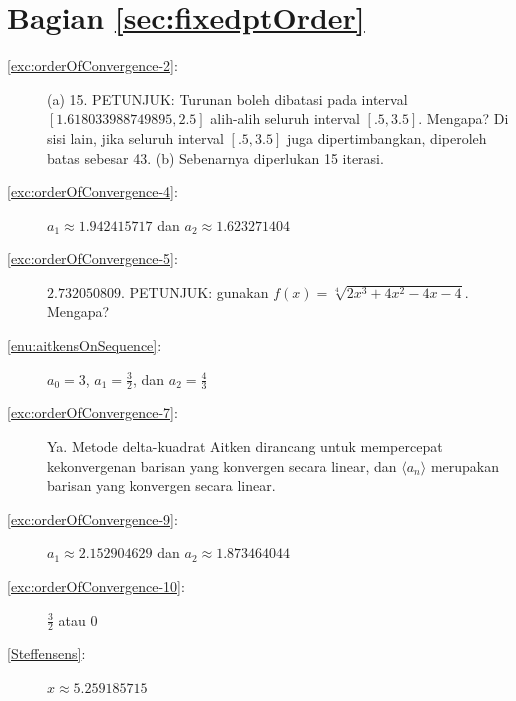 \section*{Bagian \ref{sec:fixedptOrder}}
\begin{description}
\item [{\ref{exc:orderOfConvergence-2}:}] (a) 15. PETUNJUK: Turunan boleh
dibatasi pada interval $[1.618033988749895,2.5]$ alih-alih seluruh
interval $[.5,3.5]$. Mengapa? Di sisi lain, jika seluruh interval
$[.5,3.5]$ juga dipertimbangkan, diperoleh batas sebesar 43. (b)
Sebenarnya diperlukan 15 iterasi.
\item [{\ref{exc:orderOfConvergence-4}:}] $a_{1}\approx1.942415717$ dan
$a_{2}\approx1.623271404$
\item [{\ref{exc:orderOfConvergence-5}:}] $2.732050809$. PETUNJUK: gunakan
$f(x)=\sqrt[4]{2x^{3}+4x^{2}-4x-4}$. Mengapa?
\item [{\ref{enu:aitkensOnSequence}:}] $a_{0}=3$, $a_{1}=\frac{3}{2}$,
dan $a_{2}=\frac{4}{3}$
\item [{\ref{exc:orderOfConvergence-7}:}] Ya. Metode delta-kuadrat Aitken
dirancang untuk mempercepat kekonvergenan barisan yang konvergen secara
linear, dan $\langle a_{n}\rangle$ merupakan barisan yang konvergen
secara linear.
\item [{\ref{exc:orderOfConvergence-9}:}] $a_{1}\approx2.152904629$ dan
$a_{2}\approx1.873464044$
\item [{\ref{exc:orderOfConvergence-10}:}] $\frac{3}{2}$ atau $0$
\item [{\ref{Steffensens}:}] $\hat{x}\approx5.259185715$
\end{description}


